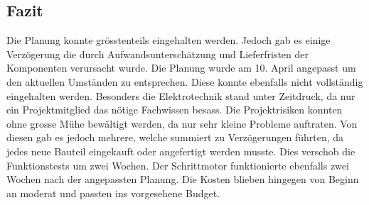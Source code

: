 \subsection{Fazit}

Die Planung konnte grösstenteils eingehalten werden. Jedoch gab es einige Verzögerung die durch Aufwandsunterschätzung und Lieferfristen der Komponenten verursacht wurde. Die Planung wurde am 10. April angepasst um den aktuellen Umständen zu entsprechen. Diese konnte ebenfalls nicht vollständig eingehalten werden. Besonders die Elektrotechnik stand unter Zeitdruck, da nur ein Projektmitglied das nötige Fachwissen besass.
Die Projektrisiken konnten ohne grosse Mühe bewältigt werden, da nur sehr kleine Probleme auftraten.
Von diesen gab es jedoch mehrere, welche summiert zu Verzögerungen führten, da jedes neue Bauteil eingekauft oder angefertigt werden musste. Dies verschob die Funktionstests um zwei Wochen.
Der Schrittmotor funktionierte ebenfalls zwei Wochen nach der angepassten Planung.
Die Kosten blieben hingegen von Beginn an moderat und passten ins vorgesehene Budget.
